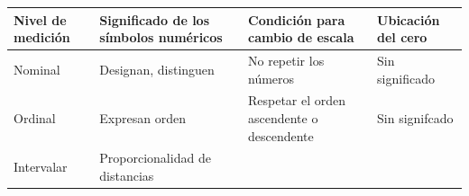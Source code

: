 \documentclass[]{book}
\begin{document}
\begin{longtable}[]{@{}llll@{}}
\toprule
\begin{minipage}[b]{0.14\columnwidth}\raggedright
Nivel de medición\strut
\end{minipage} & \begin{minipage}[b]{0.29\columnwidth}\raggedright
Significado de los símbolos numéricos\strut
\end{minipage} & \begin{minipage}[b]{0.32\columnwidth}\raggedright
Condición para cambio de escala\strut
\end{minipage} & \begin{minipage}[b]{0.14\columnwidth}\raggedright
Ubicación del cero\strut
\end{minipage}\tabularnewline
\midrule
\endhead
\begin{minipage}[t]{0.14\columnwidth}\raggedright
Nominal\strut
\end{minipage} & \begin{minipage}[t]{0.29\columnwidth}\raggedright
Designan, distinguen\strut
\end{minipage} & \begin{minipage}[t]{0.32\columnwidth}\raggedright
No repetir los números\strut
\end{minipage} & \begin{minipage}[t]{0.14\columnwidth}\raggedright
Sin significado\strut
\end{minipage}\tabularnewline
\begin{minipage}[t]{0.14\columnwidth}\raggedright
Ordinal\strut
\end{minipage} & \begin{minipage}[t]{0.29\columnwidth}\raggedright
Expresan orden\strut
\end{minipage} & \begin{minipage}[t]{0.32\columnwidth}\raggedright
Respetar el orden ascendente o descendente\strut
\end{minipage} & \begin{minipage}[t]{0.14\columnwidth}\raggedright
Sin signifcado\strut
\end{minipage}\tabularnewline
\begin{minipage}[t]{0.14\columnwidth}\raggedright
Intervalar\strut
\end{minipage} & \begin{minipage}[t]{0.29\columnwidth}\raggedright
Proporcionalidad de distancias\strut
\end{minipage} & \begin{minipage}[t]{0.32\columnwidth}\raggedright

\end{minipage}
\end{longtable}
\end{document}
